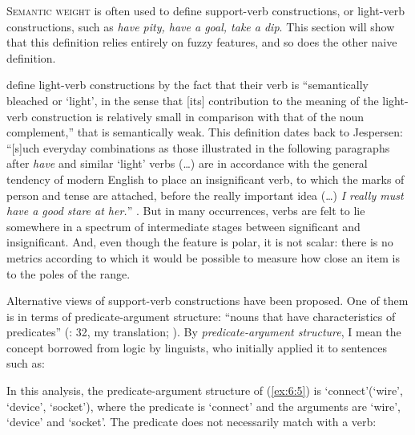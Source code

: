 \documentclass[output=paper]{langsci/langscibook}
\begin{document}
\textsc{Semantic weight} is often used to define support-verb constructions, or light-verb constructions, such as \textit{have pity, have a goal, take a dip}. This section will show that this definition relies entirely on fuzzy features, and so does the other naive definition. 

\citet[276]{Baldwin2010} define light-verb constructions by the fact that their  verb is “semantically bleached or ‘light’, in the sense that [its] contribution to the meaning of the light-verb construction is relatively small in comparison with that of the noun complement,” that is semantically weak. This definition dates back to Jespersen: “[s]uch everyday combinations as those illustrated in the following paragraphs after \textit{have} and similar ‘light’ verbs (\ldots) are in accordance with the general tendency of modern English to place an insignificant verb, to which the marks of person and tense are attached, before the really important idea (\ldots) \textit{I really must have a good stare at her.}” \citep[117]{Jespersen1942}. But in many occurrences, verbs are felt to lie somewhere in a spectrum of intermediate stages between significant and insignificant. And, even though the feature is polar, it is not scalar: there is no metrics according to which it would be possible to measure how close an item is to the poles of the range.

Alternative views of support-verb constructions have been proposed. One of them is in terms of predicate-argument structure: “nouns that have characteristics of predicates” (\citealt{Gross1981}: 32, my translation; \citealt{Cattell1984}). By \textit{predicate-argument structure}, I mean the concept borrowed from logic by linguists, who initially applied it \citep{Tesniere1959} to sentences such as:

\begin{exe}
\end{exe}
	
\noindent In this analysis, the predicate-argument structure of (\ref{ex:6:5}) is ‘connect’(‘wire’, ‘device’, ‘socket’), where the predicate is ‘connect’ and the arguments are ‘wire’, ‘device’ and ‘socket’. The predicate does not necessarily match with a verb:


\begin{exe}
\end{exe}
\end{document}
